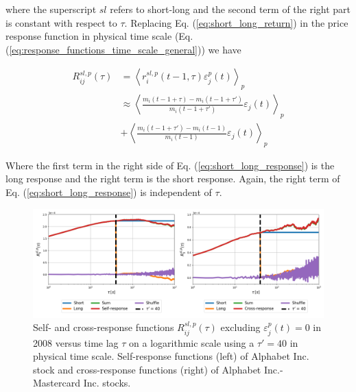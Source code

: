 where the superscript $sl$ refers to short-long and the second term of the
right part is constant with respect to $\tau$. Replacing Eq.
(\ref{eq:short_long_return}) in the price response function in physical time
scale (Eq. (\ref{eq:response_functions_time_scale_general})) we have

\begin{align}\label{eq:short_long_response}
    R^{sl,p}_{ij}\left(\tau\right)&=\left\langle
    r^{sl,p}_{i}\left(t - 1, \tau\right)
    \varepsilon^{p}_{j}\left(t\right)\right\rangle _{p} \nonumber \\
    &\approx\left\langle \frac{m_{i}\left(t - 1 +\tau\right)-m_{i}
    \left(t - 1 +\tau'\right)} {m_{i}\left(t - 1 +\tau'\right)}
    \varepsilon_{j} \left(t\right)\right\rangle _{p} \nonumber \\
    & +\left\langle \frac{m_{i} \left(t - 1 +\tau'\right)-m_{i}
    \left(t - 1\right)}{m_{i}\left(t - 1\right)}
    \varepsilon_{j}\left(t\right)\right\rangle _{p}
\end{align}

Where the first term in the right side of Eq. (\ref{eq:short_long_response})
is the long response and the right term is the short response. Again, the right
term of Eq. (\ref{eq:short_long_response}) is independent of $\tau$.

\begin{figure}[htbp]
    \centering
    \includegraphics[width=\textwidth]
    {figures/05_short_long_GOOG_MA.png}
    \caption{Self- and cross-response functions
             $R^{sl,p}_{ij}\left(\tau\right)$ excluding
             $\varepsilon^{p}_{j}\left(t\right) = 0$ in 2008 versus time lag
             $\tau$ on a logarithmic scale using a $\tau'=40$ in physical time
             scale. Self-response functions (left) of Alphabet Inc. stock and
             cross-response functions (right) of Alphabet Inc.-Mastercard Inc.
             stocks.}
    \label{fig:short_long_responses}
\end{figure}

